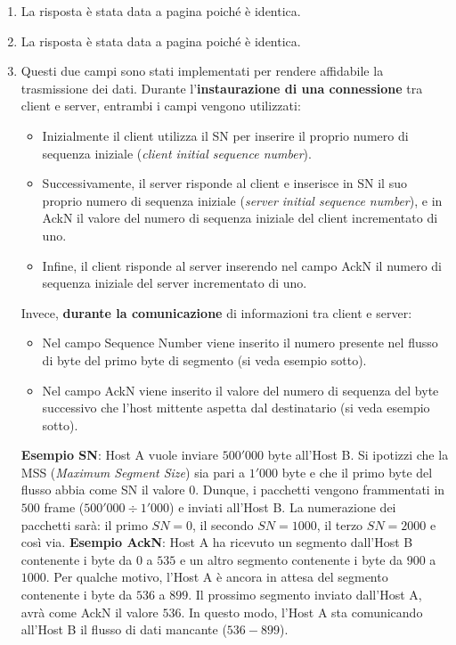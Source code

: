 \documentclass[a4paper]{article}
\begin{document}
	\begin{enumerate}
		\item La risposta è stata data a pagina \pageref{CSMA/CD} poiché è identica.
		
		\item La risposta è stata data a pagina \pageref{TTL} poiché è identica.
		
		\item Questi due campi sono stati implementati per rendere affidabile la trasmissione dei dati.\newline
		Durante l'\textbf{instaurazione di una connessione} tra client e server, entrambi i campi vengono utilizzati:
		\begin{itemize}
			\item Inizialmente il client utilizza il SN per inserire il proprio numero di sequenza iniziale (\emph{client initial sequence number}).
			
			\item Successivamente, il server risponde al client e inserisce in SN il suo proprio numero di sequenza iniziale (\emph{server initial sequence number}), e in AckN il valore del numero di sequenza iniziale del client incrementato di uno.
			
			\item Infine, il client risponde al server inserendo nel campo AckN il numero di sequenza iniziale del server incrementato di uno.
		\end{itemize}\newpage
		Invece, \textbf{durante la comunicazione} di informazioni tra client e server:
		\begin{itemize}
			\item Nel campo Sequence Number viene inserito il numero presente nel flusso di byte del primo byte di segmento (si veda esempio sotto).
			
			\item Nel campo AckN viene inserito il valore del numero di sequenza del byte successivo che l'host mittente aspetta dal destinatario (si veda esempio sotto).
		\end{itemize}
		\textbf{Esempio SN}: Host A vuole inviare $500'000$ byte all'Host B. Si ipotizzi che la MSS (\emph{Maximum Segment Size}) sia pari a $1'000$ byte e che il primo byte del flusso abbia come SN il valore $0$. Dunque, i pacchetti vengono frammentati in $500$ frame ($500'000 \div 1'000$) e inviati all'Host B. La numerazione dei pacchetti sarà: il primo $SN = 0$, il secondo $SN = 1000$, il terzo $SN = 2000$ e così via.\newline
		\textbf{Esempio AckN}: Host A ha ricevuto un segmento dall'Host B contenente i byte da $0$ a $535$ e un altro segmento contenente i byte da $900$ a $1000$. Per qualche motivo, l'Host A è ancora in attesa del segmento contenente i byte da $536$ a $899$. Il prossimo segmento inviato dall'Host A, avrà come AckN il valore $536$. In questo modo, l'Host A sta comunicando all'Host B il flusso di dati mancante ($536 - 899$).
	\end{enumerate}
	
\end{document}
